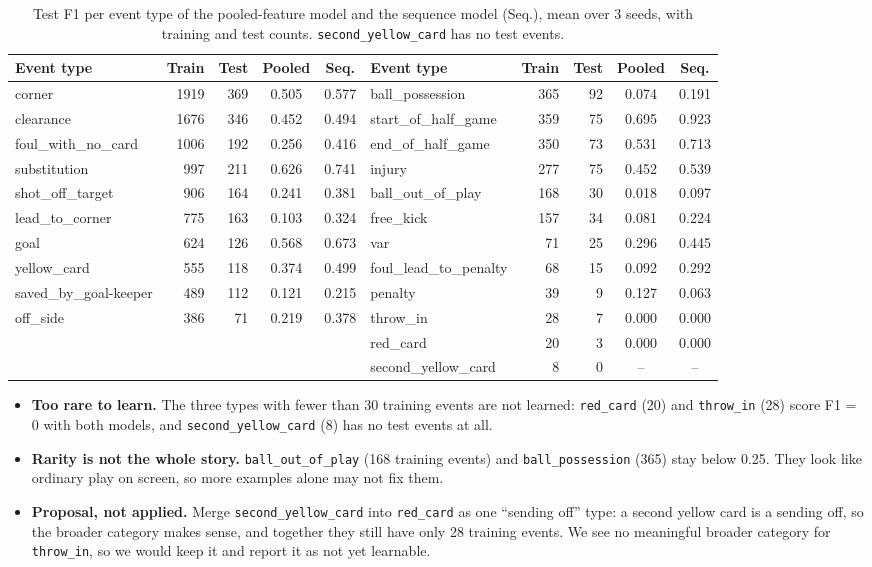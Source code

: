 \documentclass[11pt]{article}
\begin{document}
\begin{table}[h]
\centering\footnotesize\setlength{\tabcolsep}{4pt}
\begin{tabular}{lrrcc@{\hspace{2.5em}}lrrcc}
\toprule
Event type & Train & Test & Pooled & Seq. & Event type & Train & Test & Pooled & Seq.\\
\midrule
corner & 1919 & 369 & 0.505 & 0.577 & ball\_possession & 365 & 92 & 0.074 & 0.191\\
clearance & 1676 & 346 & 0.452 & 0.494 & start\_of\_half\_game & 359 & 75 & 0.695 & 0.923\\
foul\_with\_no\_card & 1006 & 192 & 0.256 & 0.416 & end\_of\_half\_game & 350 & 73 & 0.531 & 0.713\\
substitution & 997 & 211 & 0.626 & 0.741 & injury & 277 & 75 & 0.452 & 0.539\\
shot\_off\_target & 906 & 164 & 0.241 & 0.381 & ball\_out\_of\_play & 168 & 30 & 0.018 & 0.097\\
lead\_to\_corner & 775 & 163 & 0.103 & 0.324 & free\_kick & 157 & 34 & 0.081 & 0.224\\
goal & 624 & 126 & 0.568 & 0.673 & var & 71 & 25 & 0.296 & 0.445\\
yellow\_card & 555 & 118 & 0.374 & 0.499 & foul\_lead\_to\_penalty & 68 & 15 & 0.092 & 0.292\\
saved\_by\_goal-keeper & 489 & 112 & 0.121 & 0.215 & penalty & 39 & 9 & 0.127 & 0.063\\
off\_side & 386 & 71 & 0.219 & 0.378 & throw\_in & 28 & 7 & 0.000 & 0.000\\
 & & & & & red\_card & 20 & 3 & 0.000 & 0.000\\
 & & & & & second\_yellow\_card & 8 & 0 & -- & --\\
\bottomrule
\end{tabular}
\caption{Test F1 per event type of the pooled-feature model and the sequence model (Seq.), mean over 3 seeds,
with training and test counts. \texttt{second\_yellow\_card} has no test events.}
\label{tab:perclass}
\end{table}

\begin{itemize}[noitemsep]
  \item \textbf{Too rare to learn.} The three types with fewer than 30 training events are not learned:
        \texttt{red\_card} (20) and \texttt{throw\_in} (28) score F1 = 0 with both models, and
        \texttt{second\_yellow\_card} (8) has no test events at all.
  \item \textbf{Rarity is not the whole story.} \texttt{ball\_out\_of\_play} (168 training events) and
        \texttt{ball\_possession} (365) stay below 0.25. They look like ordinary play on screen, so more
        examples alone may not fix them.
  \item \textbf{Proposal, not applied.} Merge \texttt{second\_yellow\_card} into \texttt{red\_card} as one
        ``sending off'' type: a second yellow card is a sending off, so the broader category makes sense, and
        together they still have only 28 training events. We see no meaningful broader category for
        \texttt{throw\_in}, so we would keep it and report it as not yet learnable.
\end{itemize}
\end{document}
